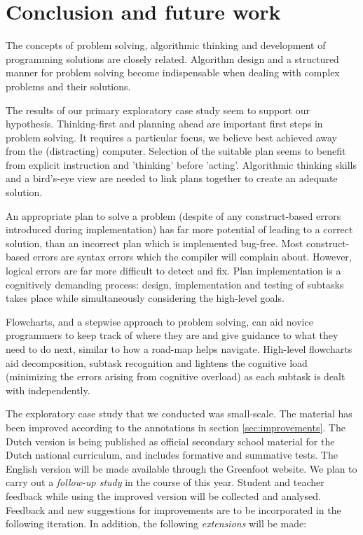 

\section{Conclusion and future work}\label{sec:conclusion}

The concepts of problem solving, algorithmic thinking and development of
programming solutions are closely related. Algorithm
design and a structured manner for problem solving become indispensable when
dealing with complex problems and their solutions.

The results of our primary exploratory case study seem to support our hypothesis. 
Thinking-first and planning ahead are important first steps in problem
solving. It requires a particular focus, we believe best achieved away from
the (distracting) computer. Selection of the suitable plan seems to benefit
from explicit instruction and 'thinking' before 'acting'. Algorithmic
thinking skills and a bird's-eye view are needed to link plans together to
create an adequate solution.


An appropriate plan to solve a problem (despite of any construct-based errors
introduced during implementation) has far more potential of leading to a
correct solution, than an incorrect plan which is implemented bug-free. Most
construct-based errors are syntax errors which the compiler will complain
about. However, logical errors are far more difficult to detect and fix. Plan
implementation is a cognitively demanding process: design, implementation and
testing of subtasks takes place while simultaneously considering the
high-level goals.

Flowcharts, and a stepwise approach to problem solving, can aid novice
programmers to keep track of where they are and give guidance to what they
need to do next, similar to how a road-map helps navigate. High-level
flowcharts aid decomposition, subtask recognition and lightens the cognitive
load (minimizing the errors arising from cognitive overload) as each subtask
is dealt with independently.


The exploratory case study that we conducted was small-scale. The material has been improved according to the annotations in section
\ref{sec:improvements}. The Dutch version is being published as official secondary school material for the Dutch national curriculum, and includes formative and summative tests. The English version will be made available through the Greenfoot website. We plan to carry out a \emph{follow-up study} in the course of this year. Student and teacher feedback while using the improved version will be collected and analysed. Feedback and new suggestions for improvements are to be incorporated in the following iteration. In addition, the following \emph{extensions} will be made:

